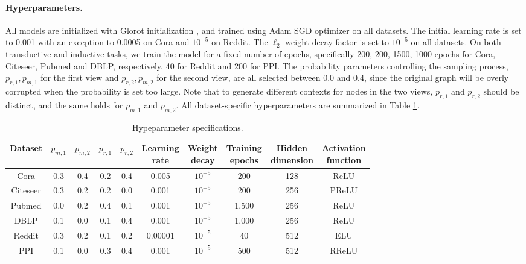\documentclass{article}
\theoremstyle{remark}
\begin{document}
\paragraph{Hyperparameters.}
All models are initialized with Glorot initialization \cite{Glorot:2010uc}, and trained using Adam SGD optimizer \cite{Kingma:2015us} on all datasets.
The initial learning rate is set to 0.001 with an exception to 0.0005 on Cora and \(10^{-5}\) on Reddit.
The \(\ell_2\) weight decay factor is set to \(10^{-5}\) on all datasets.
On both transductive and inductive tasks, we train the model for a fixed number of epochs, specifically 200, 200, 1500, 1000 epochs for Cora, Citeseer, Pubmed and DBLP, respectively, 40 for Reddit and 200 for PPI.
The probability parameters controlling the sampling process, \(p_{r,1}, p_{m,1}\) for the first view and \(p_{r,2}, p_{m,2}\) for the second view, are all selected between 0.0 and 0.4, since the original graph will be overly corrupted when the probability is set too large. Note that to generate different contexts for nodes in the two views, \(p_{r,1}\) and \(p_{r,2}\) should be distinct, and the same holds for \(p_{m,1}\) and \(p_{m,2}\).
All dataset-specific hyperparameters are summarized in Table \ref{tab:hyperparameters}.

\begin{table}[h]
	\small
	\centering
	\caption{Hypeparameter specifications.}
    \begin{tabular}{cccccccccc}
	\toprule
	Dataset & \(p_{m,1}\) & \(p_{m,2}\) & \(p_{r,1}\) & \(p_{r,2}\) & \makecell{Learning\\rate} & \makecell{Weight\\decay} & \makecell{Training\\epochs} & \makecell{Hidden\\dimension} & \makecell{Activation\\function} \\
	\midrule
	Cora  & 0.3   & 0.4   & 0.2   & 0.4   & 0.005 & \(10^{-5}\) & 200   & 128   & ReLU \\
	Citeseer & 0.3   & 0.2   & 0.2   & 0.0   & 0.001 & \(10^{-5}\) & 200   & 256   & PReLU \\
	Pubmed & 0.0   & 0.2   & 0.4   & 0.1   & 0.001 & \(10^{-5}\) & 1,500  & 256   & ReLU \\
	DBLP  & 0.1   & 0.0   & 0.1   & 0.4   & 0.001 & \(10^{-5}\) & 1,000  & 256   & ReLU \\
	\midrule
	Reddit & 0.3   & 0.2   & 0.1   & 0.2   & 0.00001 & \(10^{-5}\) & 40    & 512   & ELU \\
	PPI   & 0.1   & 0.0   & 0.3   & 0.4   & 0.001 & \(10^{-5}\) & 500   & 512   & RReLU \\
	\bottomrule
	\end{tabular}
	\label{tab:hyperparameters}
\end{table}
\end{document}
